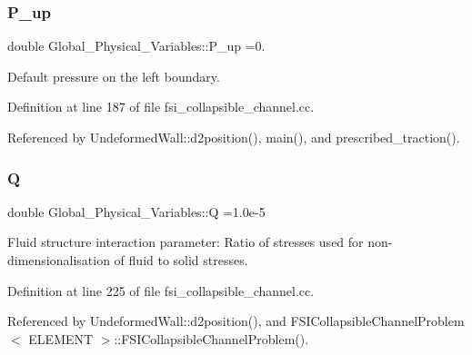 \mbox{\label{namespaceGlobal__Physical__Variables_ae1a493695b7f4619af32f405b0b28861}} 
\subsubsection{\texorpdfstring{P\+\_\+up}{P\_up}}
{\footnotesize\ttfamily double Global\+\_\+\+Physical\+\_\+\+Variables\+::\+P\+\_\+up =0.}



Default pressure on the left boundary. 



Definition at line 187 of file fsi\+\_\+collapsible\+\_\+channel.\+cc.



Referenced by Undeformed\+Wall\+::d2position(), main(), and prescribed\+\_\+traction().

\mbox{\label{namespaceGlobal__Physical__Variables_a66cb7ecda9ba0cd72367dd697f154545}} 
\subsubsection{\texorpdfstring{Q}{Q}}
{\footnotesize\ttfamily double Global\+\_\+\+Physical\+\_\+\+Variables\+::Q =1.\+0e-\/5}



Fluid structure interaction parameter\+: Ratio of stresses used for non-\/dimensionalisation of fluid to solid stresses. 



Definition at line 225 of file fsi\+\_\+collapsible\+\_\+channel.\+cc.



Referenced by Undeformed\+Wall\+::d2position(), and F\+S\+I\+Collapsible\+Channel\+Problem$<$ E\+L\+E\+M\+E\+N\+T $>$\+::\+F\+S\+I\+Collapsible\+Channel\+Problem().

\mbox{\label{namespaceGlobal__Physical__Variables_ab814e627d2eb5bc50318879d19ab16b9}} 
